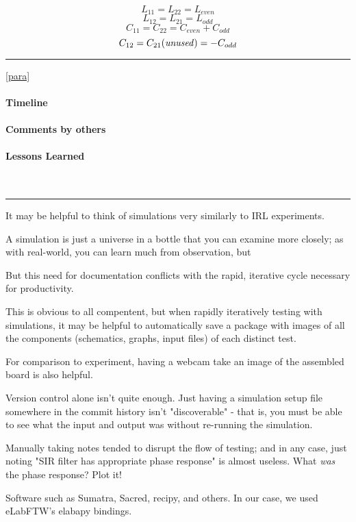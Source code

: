 \documentclass[fleqn,10pt]{article}
\begin{document}
\[ L_{11} = L_{22} = L_{even}  \]
\[ L_{12} = L_{21} = L_{odd}  \]
\[ C_{11} = C_{22} = C_{even}+C_{odd}  \]
\[ C_{12} = C_{21} {\it{(unused)}} = -C_{odd}  \]

\rule{\linewidth}{0.2pt}



\label{para}
\ref{para}

\paragraph{Timeline}

\paragraph{Comments by others}

\paragraph{Lessons Learned} \


\rule{\linewidth}{0.2pt}

It may be helpful to think of simulations very similarly to IRL experiments. 

A simulation is just a universe in a bottle that you can examine more closely; as with real-world, you can learn much from observation, but 

But this need for documentation conflicts with the rapid, iterative cycle necessary for productivity.

This is obvious to all compentent, but when rapidly iteratively testing with simulations, it may be helpful to automatically save a package with images of all the components (schematics, graphs, input files) of each distinct test. 

For comparison to experiment, having a webcam take an image of the assembled board is also helpful. 

Version control alone isn't quite enough. Just having a simulation setup file somewhere in the commit history isn't "discoverable" - that is, you must be able to see what the input and output was without re-running the simulation. 

Manually taking notes tended to disrupt the flow of testing; and in any case, just noting "SIR filter has appropriate phase response" is almost useless. What {\it was} the phase response? Plot it!

Software such as Sumatra, Sacred, recipy, and others. In our case, we used eLabFTW's elabapy bindings.
\end{document}
